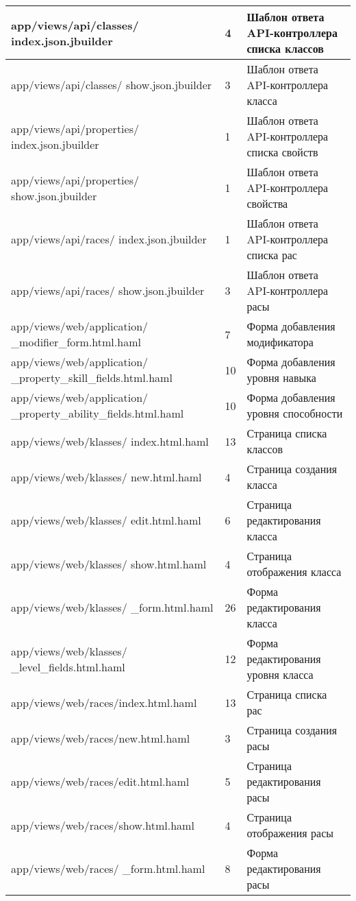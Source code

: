\begin{longtable}[h]{| p{} | p{} | p{} |}
  \hline
  app/views/api/classes/ index.json.jbuilder  &  4  &  Шаблон ответа API-контроллера списка классов \\
  \hline
  app/views/api/classes/ show.json.jbuilder  &  3  &  Шаблон ответа API-контроллера класса \\
  \hline
  app/views/api/properties/ index.json.jbuilder  &  1  &  Шаблон ответа API-контроллера списка свойств \\
  \hline
  app/views/api/properties/ show.json.jbuilder  &  1  &  Шаблон ответа API-контроллера свойства \\
  \hline
  app/views/api/races/ index.json.jbuilder  &  1  &  Шаблон ответа API-контроллера списка рас \\
  \hline
  app/views/api/races/ show.json.jbuilder  &  3  &  Шаблон ответа API-контроллера расы \\
  \hline
  app/views/web/application/ \_modifier\_form.html.haml  &  7  &  Форма добавления модификатора \\
  \hline
  app/views/web/application/ \_property\_skill\_fields.html.haml  &  10  &  Форма добавления уровня навыка \\
  \hline
  app/views/web/application/ \_property\_ability\_fields.html.haml  &  10  &  Форма добавления уровня способности \\
  \hline
  app/views/web/klasses/ index.html.haml  &  13  &  Страница списка классов \\
  \hline
  app/views/web/klasses/ new.html.haml  &  4  &  Страница создания класса \\
  \hline
  app/views/web/klasses/ edit.html.haml  &  6  &  Страница редактирования класса \\
  \hline
  app/views/web/klasses/ show.html.haml  &  4  &  Страница отображения класса \\
  \hline
  app/views/web/klasses/ \_form.html.haml  &  26  &  Форма редактирования класса \\
  \hline
  app/views/web/klasses/ \_level\_fields.html.haml  &  12  &  Форма редактирования уровня класса \\
  \hline
  app/views/web/races/index.html.haml  &  13  &  Страница списка рас \\
  \hline
  app/views/web/races/new.html.haml  &  3  &  Страница создания расы \\
  \hline
  app/views/web/races/edit.html.haml  &  5  &  Страница редактирования расы \\
  \hline
  app/views/web/races/show.html.haml  &  4  &  Страница отображения расы \\
  \hline
  app/views/web/races/ \_form.html.haml  &  8  &  Форма редактирования расы \\
  \hline
\end{longtable}

